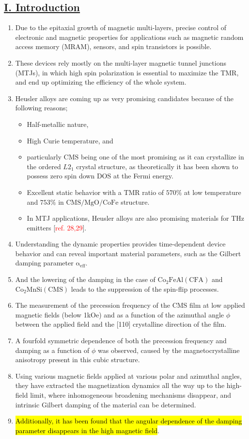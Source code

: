 \subsection*{\underline{I. Introduction}}
\begin{enumerate}
    \item Due to the epitaxial growth of magnetic multi-layers, precise control of electronic and magnetic properties for applications such as magnetic random access memory (MRAM), sensors, and spin transistors is possible.
    \item These devices rely mostly on the multi-layer magnetic tunnel junctions (MTJs), in which high spin polarization is essential to maximize the TMR, and end up optimizing the efficiency of the whole system.
    \item Heusler alloys are coming up as very promising candidates because of the following reasons;
    \begin{itemize}
        \item Half-metallic nature,
        \item High Curie temperature, and 
        \item particularly $\mathrm{CMS}$ being one of the most promising as it can crystallize in the ordered $L\mathrm{2_1}$ crystal structure, as theoretically it has been shown to possess zero spin down DOS at the Fermi energy.
        \item Excellent static behavior with a TMR ratio of $570\%$ at low temperature and $753\%$ in $\mathrm{CMS/MgO/CoFe}$ structure.
        \item In MTJ applications, Heusler alloys are also promising materials for THz emitters [\textcolor{red}{ref. 28,29}].
    \end{itemize}
    \item Understanding the dynamic properties provides time-dependent device behavior and can reveal important material parameters, such as the Gilbert damping parameter $\mathrm{\alpha_{eff}}$.
    \item And the lowering of the damping in the case of $\mathrm{Co_2FeAl(CFA)}$ and  $\mathrm{Co_2MnSi(CMS)}$ leads to the suppression of the spin-flip processes.
    \item The measurement of the precession frequency of the CMS film at low applied magnetic fields (below 1kOe) and as a function of the azimuthal angle $\phi$ between the applied field and the [110] crystalline direction of the film.
    \item A fourfold symmetric dependence of both the precession frequency and damping as a function of $\phi$ was observed, caused by the magnetocrystalline anisotropy present in this cubic structure.
    \item Using various magnetic fields applied at various polar and azimuthal angles, they have extracted the magnetization dynamics all the way up to the high-field limit, where inhomogeneous broadening mechanisms disappear, and intrinsic Gilbert damping of the material can be determined.
    \item \hl{Additionally, it has been found that the angular dependence of the damping parameter disappears in the high magnetic field}.
\end{enumerate}

